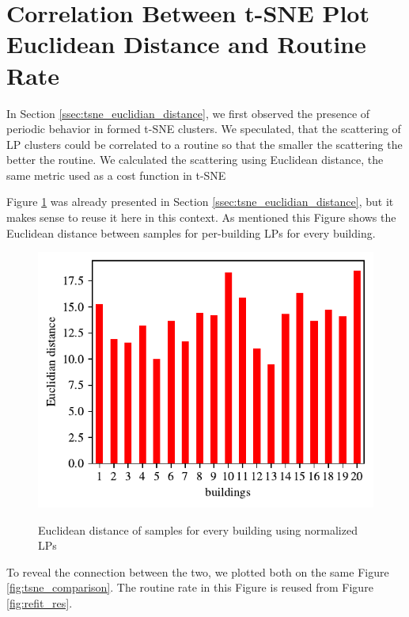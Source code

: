 \section{Correlation Between t-SNE Plot Euclidean Distance and Routine Rate}
\label{sec:tsne_ec_corr}
In Section \ref{ssec:tsne_euclidian_distance}, we first observed the presence of periodic behavior in formed t-SNE clusters.
We speculated, that the scattering of LP clusters could be correlated to a routine so that the smaller the scattering the better the routine.
We calculated the scattering using Euclidean distance, the same metric used as a cost function in t-SNE

Figure \ref{fig:tsne_euclidian2} was already presented in Section \ref{ssec:tsne_euclidian_distance},
but it makes sense to reuse it here in this context. 
As mentioned this Figure shows the Euclidean distance between samples for per-building LPs for every building.

\begin{figure}[H]
	\centering
	\caption{Euclidean distance of samples for every building using normalized LPs}
	\includegraphics[]{Figures/EC/CORR_TSNE/tnse_euclidian.pdf}
	\label{fig:tsne_euclidian2}
\end{figure}

To reveal the connection between the two, we plotted both on the same Figure \ref{fig:tsne_comparison}.
The routine rate in this Figure is reused from Figure \ref{fig:refit_res}.

